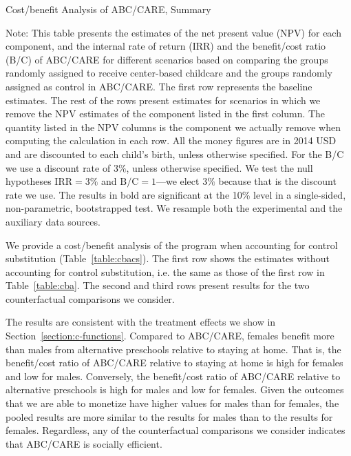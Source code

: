 \begin{table}[!htbp]
\centering
\caption{Cost/benefit Analysis of ABC/CARE, Summary}\label{table:cba}
\begin{adjustbox}{max width=\textwidth}
\begin{threeparttable}

\begin{tablenotes}
\footnotesize
\item Note: This table presents the estimates of the net present value (NPV) for each component, and the internal rate of return (IRR) and the benefit/cost ratio (B/C) of ABC/CARE for different scenarios based on comparing the groups randomly assigned to receive center-based childcare and the groups randomly assigned as control in ABC/CARE. The first row represents the baseline estimates. The rest of the rows present estimates for scenarios in which we remove the NPV estimates of the component listed in the first column. The quantity listed in the NPV columns is the component we actually remove when computing the calculation in each row. All the money figures are in 2014 USD and are discounted to each child's birth, unless otherwise specified. For the B/C we use a discount rate of $3\%$, unless otherwise specified. We test the null hypotheses $\text{IRR} = 3\%$ and $\text{B/C} = 1$---we elect $3\%$ because that is the discount rate we use. The results in bold are significant at the 10\% level in a single-sided, non-parametric, bootstrapped test. We resample both the experimental and the auxiliary data sources.
\end{tablenotes}
\end{threeparttable}
\end{adjustbox}
\end{table}

We provide a cost/benefit analysis of the program when accounting for control substitution (Table~\ref{table:cbacs}). The first row shows the estimates without accounting for control substitution, i.e. the same as those of the first row in Table~\ref{table:cba}. The second and third rows present results for the two counterfactual comparisons we consider.

The results are consistent with the treatment effects we show in Section~\ref{section:c-functions}. Compared to ABC/CARE, females benefit more than males from alternative preschools relative to staying at home. That is, the benefit/cost ratio of ABC/CARE relative to staying at home is high for females and low for males. Conversely, the benefit/cost ratio of ABC/CARE relative to alternative preschools is high for males and low for females. Given the outcomes that we are able to monetize have higher values for males than for females, the pooled results are more similar to the results for males than to the results for females. Regardless, any of the counterfactual comparisons we consider indicates that ABC/CARE is socially efficient.

